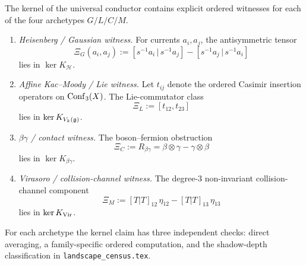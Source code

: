 \begin{theorem}
\label{thm:uc-kernel-archetypes}
\ClaimStatusProvedHere
The kernel of the universal conductor contains explicit ordered
witnesses for each of the four archetypes $G/L/C/M$.
\begin{enumerate}
\item[\textup{(G)}] \emph{Heisenberg / Gaussian witness.}
 For currents $a_i,a_j$, the antisymmetric tensor
 \[
 \Xi_G(a_i,a_j)
 :=
 [s^{-1}a_i\,|\,s^{-1}a_j]
 -
 [s^{-1}a_j\,|\,s^{-1}a_i]
 \]
 lies in $\ker K_{\mathcal H}$.
\item[\textup{(L)}] \emph{Affine Kac--Moody / Lie witness.}
 Let $t_{ij}$ denote the ordered Casimir insertion operators on
 $\operatorname{Conf}_3(X)$. The Lie-commutator class
 \[
 \Xi_L
 :=
 [t_{12},t_{23}]
 \]
 lies in $\ker K_{V_k(\mathfrak{g})}$.
\item[\textup{(C)}] \emph{$\beta\gamma$ / contact witness.}
 The boson--fermion obstruction
 \[
 \Xi_C
 :=
 R_{\beta\gamma}
 =
 \beta\otimes\gamma-\gamma\otimes\beta
 \]
 lies in $\ker K_{\beta\gamma}$.
\item[\textup{(M)}] \emph{Virasoro / collision-channel witness.}
 The degree-$3$ non-invariant collision-channel component
 \[
 \Xi_M
 :=
 [T|T]_{12}\,\eta_{12}
 -
 [T|T]_{13}\,\eta_{13}
 \]
 lies in $\ker K_{\mathrm{Vir}}$.
\end{enumerate}
For each archetype the kernel claim has three independent
checks: direct averaging, a family-specific ordered
computation, and the shadow-depth classification in
\texttt{landscape\_census.tex}.
\end{theorem}

